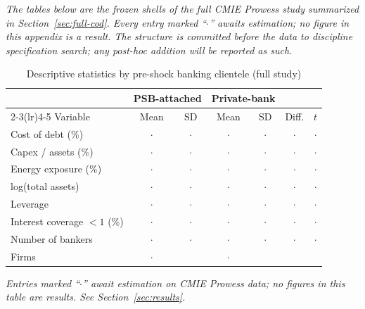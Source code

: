 \documentclass[12pt]{article}
\newcommand{\tbd}{\multicolumn{1}{c}{$\cdot$}}
\newcommand{\TBDNOTE}{\emph{Entries marked ``$\cdot$'' await estimation on CMIE Prowess data;
no figures in this table are results. See Section~\ref{sec:results}.}}
\begin{document}
\emph{The tables below are the frozen shells of the full CMIE Prowess study summarized in
Section~\ref{sec:full-cod}. Every entry marked ``$\cdot$'' awaits estimation; no figure in
this appendix is a result. The structure is committed before the data to discipline
specification search; any post-hoc addition will be reported as such.}

\begin{table}[h]
\centering
\begin{threeparttable}
\caption{Descriptive statistics by pre-shock banking clientele (full study)}
\label{tab:desc}
\small
\begin{tabular}{lcccccc}
\toprule
& \multicolumn{2}{c}{PSB-attached} & \multicolumn{2}{c}{Private-bank} & & \\
\cmidrule(lr){2-3}\cmidrule(lr){4-5}
Variable & Mean & SD & Mean & SD & Diff. & $t$ \\
\midrule
Cost of debt (\%)            & \tbd & \tbd & \tbd & \tbd & \tbd & \tbd \\
Capex / assets (\%)          & \tbd & \tbd & \tbd & \tbd & \tbd & \tbd \\
Energy exposure (\%)         & \tbd & \tbd & \tbd & \tbd & \tbd & \tbd \\
log(total assets)            & \tbd & \tbd & \tbd & \tbd & \tbd & \tbd \\
Leverage                     & \tbd & \tbd & \tbd & \tbd & \tbd & \tbd \\
Interest coverage $<1$ (\%)  & \tbd & \tbd & \tbd & \tbd & \tbd & \tbd \\
Number of bankers            & \tbd & \tbd & \tbd & \tbd & \tbd & \tbd \\
Firms                        & \tbd &      & \tbd &      &      &      \\
\bottomrule
\end{tabular}
\begin{tablenotes}\footnotesize
\item \TBDNOTE
\end{tablenotes}
\end{threeparttable}
\end{table}
\end{document}
